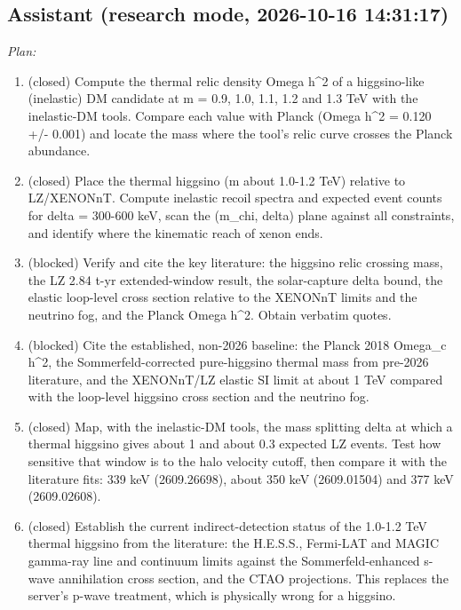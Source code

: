 \documentclass[11pt,a4paper]{article}
\begin{document}
\subsection*{Assistant \small(research mode, 2026-10-16 14:31:17)}
\textit{Plan:}\begin{enumerate}
  \item (closed) Compute the thermal relic density Omega h\textasciicircum{}2 of a higgsino-like (inelastic) DM candidate at m = 0.9, 1.0, 1.1, 1.2 and 1.3 TeV with the inelastic-DM tools. Compare each value with Planck (Omega h\textasciicircum{}2 = 0.120 +/- 0.001) and locate the mass where the tool's relic curve crosses the Planck abundance.
  \item (closed) Place the thermal higgsino (m about 1.0-1.2 TeV) relative to LZ/XENONnT. Compute inelastic recoil spectra and expected event counts for delta = 300-600 keV, scan the (m\_chi, delta) plane against all constraints, and identify where the kinematic reach of xenon ends.
  \item (blocked) Verify and cite the key literature: the higgsino relic crossing mass, the LZ 2.84 t-yr extended-window result, the solar-capture delta bound, the elastic loop-level cross section relative to the XENONnT limits and the neutrino fog, and the Planck Omega h\textasciicircum{}2. Obtain verbatim quotes.
  \item (blocked) Cite the established, non-2026 baseline: the Planck 2018 Omega\_c h\textasciicircum{}2, the Sommerfeld-corrected pure-higgsino thermal mass from pre-2026 literature, and the XENONnT/LZ elastic SI limit at about 1 TeV compared with the loop-level higgsino cross section and the neutrino fog.
  \item (closed) Map, with the inelastic-DM tools, the mass splitting delta at which a thermal higgsino gives about 1 and about 0.3 expected LZ events. Test how sensitive that window is to the halo velocity cutoff, then compare it with the literature fits: 339 keV (2609.26698), about 350 keV (2609.01504) and 377 keV (2609.02608).
  \item (closed) Establish the current indirect-detection status of the 1.0-1.2 TeV thermal higgsino from the literature: the H.E.S.S., Fermi-LAT and MAGIC gamma-ray line and continuum limits against the Sommerfeld-enhanced s-wave annihilation cross section, and the CTAO projections. This replaces the server's p-wave treatment, which is physically wrong for a higgsino.
\end{enumerate}
\end{document}

